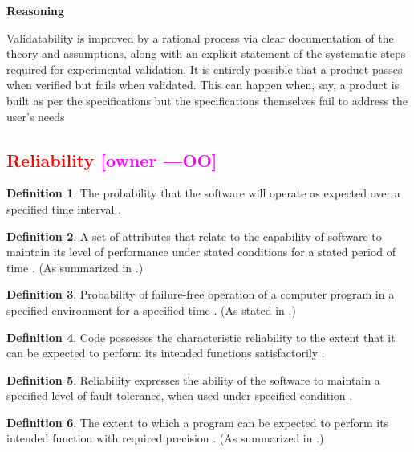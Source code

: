 \documentclass[letterpaper,cleveref]{lipics-v2019}
\newcommand{\authornote}[3]{\textcolor{#1}{[#3 ---#2]}}
\newcommand{\authornote}[3]{}
\newcommand{\oo}[1]{\authornote{magenta}{OO}{#1}} %
\newcommand{\notdone}[1]{\textcolor{red}{#1}}
\theoremstyle{definition}
\newtheorem{defn}{Definition}
\begin{document}
\noindent \textbf{Reasoning}

Validatability is improved by a rational process via clear documentation of the
theory and assumptions, along with an explicit statement of the systematic steps
required for experimental validation. It is entirely possible that a product passes when verified but fails when validated. This can happen when, say, a product is built as per the specifications but the specifications themselves fail to address the user’s needs

\subsection{\notdone{Reliability} \oo{owner}}

\begin{defn}
	The probability that the software will operate as expected over a specified
	time interval \citep{GhezziEtAl2003}.
\end{defn}

\begin{defn}
	A set of attributes that relate to the capability of software to maintain its
	level of performance under stated conditions for a stated period of time \citep{iso2001iec}. (As summarized in \citet{berander2005software}.)
\end{defn}

\begin{defn} \label{reliabilitySelected1}
	Probability of failure-free operation of a computer program in a specified environment for a specified time \citep{musa1987software}. (As stated in \citet{pressman2005software}.)
\end{defn}

\begin{defn}
	Code possesses the characteristic reliability to the extent that it can be
	expected to perform its intended functions satisfactorily
	\citep{boehm1976quantitative}.
\end{defn}

\begin{defn} \label{reliabilitySelected2}
   Reliability expresses the ability of the software to maintain a specified
   level of fault tolerance, when used under specified condition \citep{singh2013different}.
\end{defn}
\begin{defn}
	The extent to which a program can be expected to perform its intended
	function with required precision \citep{McCallEtAl1977}. (As summarized in
    \citet{VanVliet2000}.)
\end{defn}
\end{document}
